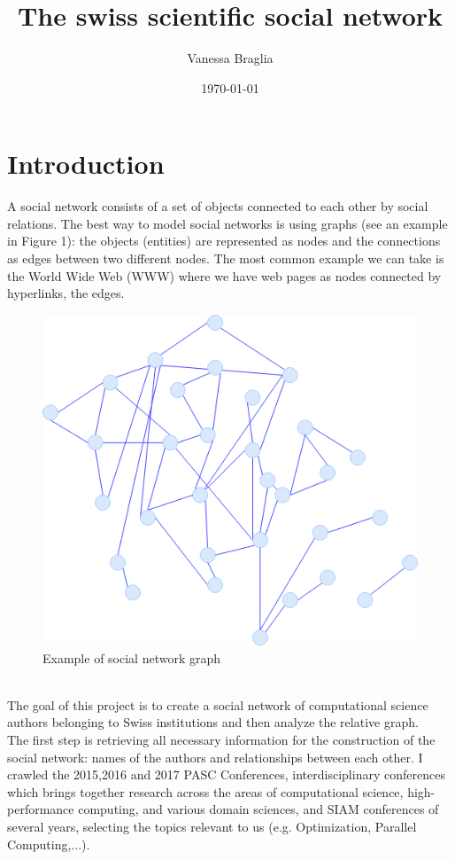 \documentclass[12 pt]{article}
\author{Vanessa Braglia}
\title{The swiss scientific social network}
\date{\today}
\begin{document}
\selectfont
\maketitle 
\newpage
\tableofcontents
\newpage
\section{Introduction}
A social network consists of a set of objects connected to each other by social relations. The best way to model social networks is using graphs (see an example in Figure 1): the objects (entities) are represented as nodes and the connections as edges between two different nodes. The most common example we can take is the World Wide Web (WWW) where we have web pages as nodes connected by hyperlinks, the edges.\\
\begin{figure} [h!]
\centering 
\includegraphics[scale=0.3]{./img/graph3.png}
\caption{Example of social network graph}
\end{figure}
\\
The goal of this project is to create a social network of computational science authors belonging to Swiss institutions and then analyze the relative graph.\\
The first step is retrieving all necessary information for the construction of the social network: names of the authors and relationships between each other. I crawled the 2015,2016 and 2017 PASC Conferences, interdisciplinary conferences which brings together research across the areas of computational science, high-performance computing, and various domain sciences, and SIAM conferences of several years, selecting the topics relevant to us (e.g. Optimization, Parallel Computing,...). \\
\end{document}
